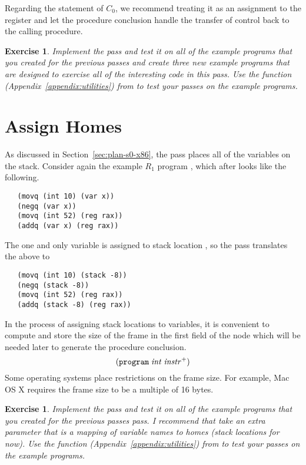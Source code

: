 \documentclass[11pt]{book}
\newtheorem{exercise}[theorem]{Exercise}
\begin{document}
Regarding the  statement of $C_0$, we recommend treating it
as an assignment to the  register and let the procedure
conclusion handle the transfer of control back to the calling
procedure.

\begin{exercise}
\normalfont
Implement the  pass and test it on all of the
example programs that you created for the previous passes and create
three new example programs that are designed to exercise all of the
interesting code in this pass. Use the  function
(Appendix~\ref{appendix:utilities}) from  to test
your passes on the example programs.
\end{exercise}

\section{Assign Homes}
\label{sec:assign-s0}

As discussed in Section~\ref{sec:plan-s0-x86}, the
 pass places all of the variables on the stack.
Consider again the example $R_1$ program ,
which after  looks like the following.
\begin{lstlisting}
   (movq (int 10) (var x))
   (negq (var x))
   (movq (int 52) (reg rax))
   (addq (var x) (reg rax))
\end{lstlisting}
The one and only variable  is assigned to stack location
, so the  pass translates the
above to
\begin{lstlisting}
   (movq (int 10) (stack -8))
   (negq (stack -8))
   (movq (int 52) (reg rax))
   (addq (stack -8) (reg rax))
\end{lstlisting}

In the process of assigning stack locations to variables, it is
convenient to compute and store the size of the frame in the first
field of the  node which will be needed later to generate
the procedure conclusion. 
\[
  (\texttt{program}\;\mathit{int}\;\mathit{instr}^{+})
\]
Some operating systems place restrictions on
the frame size. For example, Mac OS X requires the frame size to be a
multiple of 16 bytes.

\begin{exercise}
\normalfont Implement the  pass and test it on all
of the example programs that you created for the previous passes pass.
I recommend that  take an extra parameter that is a
mapping of variable names to homes (stack locations for now).  Use the
 function (Appendix~\ref{appendix:utilities}) from
 to test your passes on the example programs.
\end{exercise}
\end{document}
